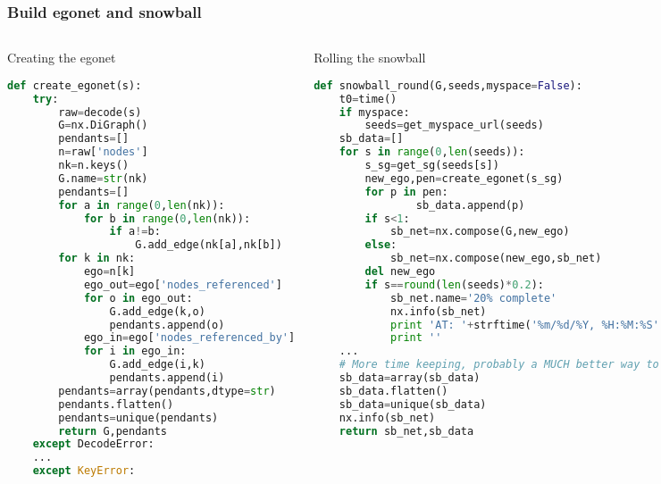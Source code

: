 \documentclass[xcolor=dvipsnames, 9pt]{beamer}
\begin{document}
\begin{frame}[fragile]
    \frametitle{Build egonet and snowball}
    \begin{columns}
        \begin{block}{\scriptsize{Creating the egonet}}
            \tiny{\begin{lstlisting}[language=Python]
def create_egonet(s):
    try:
        raw=decode(s)
        G=nx.DiGraph()
        pendants=[]
        n=raw['nodes']
        nk=n.keys()
        G.name=str(nk)
        pendants=[]
        for a in range(0,len(nk)):
            for b in range(0,len(nk)):
                if a!=b:
                    G.add_edge(nk[a],nk[b])
        for k in nk:
            ego=n[k]
            ego_out=ego['nodes_referenced']
            for o in ego_out:
                G.add_edge(k,o)
                pendants.append(o)
            ego_in=ego['nodes_referenced_by']
            for i in ego_in:
                G.add_edge(i,k)
                pendants.append(i)
        pendants=array(pendants,dtype=str)
        pendants.flatten()
        pendants=unique(pendants)
        return G,pendants
    except DecodeError:
    ...
    except KeyError:
            \end{lstlisting}}
        \end{block}
        \begin{block}{\scriptsize{Rolling the snowball}}
            \tiny{\begin{lstlisting}[language=Python]
def snowball_round(G,seeds,myspace=False):
    t0=time()
    if myspace:
        seeds=get_myspace_url(seeds)
    sb_data=[]
    for s in range(0,len(seeds)):
        s_sg=get_sg(seeds[s])
        new_ego,pen=create_egonet(s_sg)
        for p in pen:
                sb_data.append(p)
        if s<1:
            sb_net=nx.compose(G,new_ego)
        else:
            sb_net=nx.compose(new_ego,sb_net)
        del new_ego
        if s==round(len(seeds)*0.2):
            sb_net.name='20% complete'
            nx.info(sb_net)
            print 'AT: '+strftime('%m/%d/%Y, %H:%M:%S', gmtime())
            print ''
    ...
    # More time keeping, probably a MUCH better way to do this
    sb_data=array(sb_data)
    sb_data.flatten()
    sb_data=unique(sb_data)
    nx.info(sb_net)
    return sb_net,sb_data
            \end{lstlisting}}
        \end{block}
    \vspace{5mm}
    \end{columns}
\end{frame}
\end{document}
